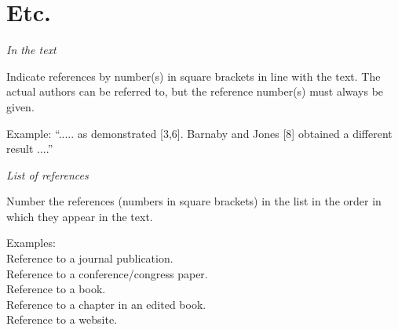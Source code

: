 \documentclass[twocolumn, 10pt]{article}
\begin{document}
\section*{Etc.}

\noindent\textit{In the text}

Indicate references by number(s) in square brackets in line with the text. The actual authors can be referred to, but the reference number(s) must always be given.

Example: “..... as demonstrated [3,6]. Barnaby and Jones [8] obtained a different result ....”

\noindent\textit{List of references}

Number the references (numbers in square brackets) in the list in the order in which they appear in the text.

Examples:\\
Reference to a journal publication\cite{art}.\\
Reference to a conference/congress paper\cite{conf}.\\
Reference to a book\cite{book}.\\
Reference to a chapter in an edited book\cite{chap}.\\
Reference to a website\cite{web}.




\end{document}
